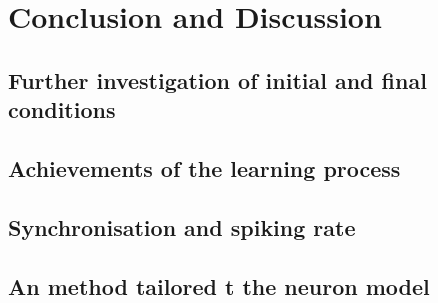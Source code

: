 \newpage
\section{Conclusion and Discussion} \label{sec:ConclusionAndDiscussion}

\subsection{Further investigation of initial and final conditions}

\subsection{Achievements of the learning process}

\subsection{Synchronisation and spiking rate}

\subsection{An \IP method tailored t the neuron model}